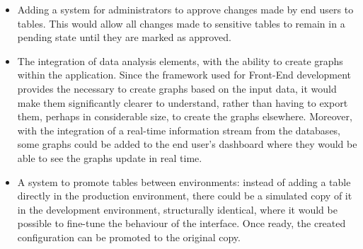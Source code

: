 \begin{itemize}
    \item Adding a system for administrators to approve changes made by end users to tables. This would allow all changes made to sensitive tables to remain in a pending state until they are marked as approved.  
    \item The integration of data analysis elements, with the ability to create graphs within the application. Since the framework used for Front-End development provides the necessary to create graphs based on the input data, it would make them significantly clearer to understand, rather than having to export them, perhaps in considerable size, to create the graphs elsewhere. Moreover, with the integration of a real-time information stream from the databases, some graphs could be added to the end user's dashboard where they would be able to see the graphs update in real time.
    \item A system to promote tables between environments: instead of adding a table directly in the production environment, there could be a simulated copy of it in the development environment, structurally identical, where it would be possible to fine-tune the behaviour of the interface. Once ready, the created configuration can be promoted to the original copy. 
\end{itemize}







